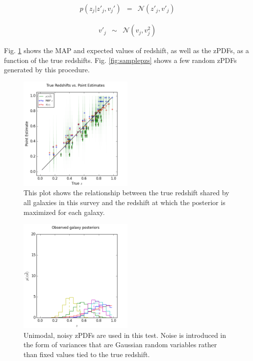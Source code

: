 \documentclass[preprint]{aastex}
\begin{document}
\begin{eqnarray}
\label{eq:zspread-noisy}
p(z_{j}|z'_{j},v_{j}') &=& \mathcal{N}(z'_{j},v'_{j})
\end{eqnarray}

\begin{eqnarray}
\label{eq:znoise}
v'_{j} &\sim& \mathcal{N}(v_{j},v^{2}_{j})
\end{eqnarray}

Fig. \ref{fig:noisycat} shows the MAP and expected values of redshift, as well as the zPDFs, as a function of the true redshifts.  Fig. \ref{fig:samplepzs} shows a few random zPDFs generated by this procedure.

\begin{figure}
\includegraphics[width=0.5\textwidth]{sigma/truevmap.png}
\caption{This plot shows the relationship between the true redshift shared by all galaxies in this survey and the redshift at which the posterior is maximized for each galaxy.}
\label{fig:noisycat}
\end{figure}

\begin{figure}
\includegraphics[width=0.5\textwidth]{sigma/samplepzs.png}
\caption{Unimodal, noisy zPDFs are used in this test.  Noise is introduced in the form of variances that are Gaussian random variables rather than fixed values tied to the true redshift.}
\label{fig:noisypzs}
\end{figure}
\end{document}
